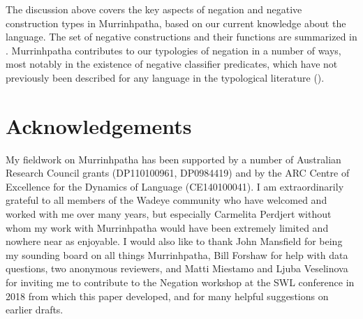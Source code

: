 \documentclass[output=paper,colorlinks,citecolor=brown]{langscibook}
\begin{document}
The discussion above covers the key aspects of negation and negative construction types in Murrinhpatha, based on our current knowledge about the language. The set of negative constructions and their functions are summarized in .
Murrinhpatha contributes to our typologies of negation in a number of ways, most notably in the existence of negative classifier predicates, which have not previously been described for any language in the typological literature ().

\section*{Acknowledgements}

My fieldwork on Murrinhpatha has been supported by a number of Australian Research Council grants (DP110100961, DP0984419) and by the ARC Centre of Excellence for the Dynamics of Language (CE140100041). I am extraordinarily grateful to all members of the Wadeye community who have welcomed and worked with me over many years, but especially Carmelita Perdjert without whom my work with Murrinhpatha would have been extremely limited and nowhere near as enjoyable. I would also like to thank John Mansfield for being my sounding board on all things Murrinhpatha, Bill Forshaw for help with data questions, two anonymous reviewers, and Matti Miestamo and Ljuba Veselinova for inviting me to contribute to the Negation workshop at the SWL conference in 2018 from which this paper developed, and for many helpful suggestions on earlier drafts. 
\end{document}
